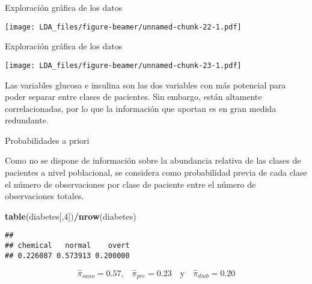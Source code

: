 \documentclass[ignorenonframetext,]{beamer}
\newenvironment{Shaded}{\begin{snugshade}}{\end{snugshade}}
\newcommand{\KeywordTok}[1]{\textcolor[rgb]{0.13,0.29,0.53}{\textbf{#1}}}
\newcommand{\DataTypeTok}[1]{\textcolor[rgb]{0.13,0.29,0.53}{#1}}
\newcommand{\DecValTok}[1]{\textcolor[rgb]{0.00,0.00,0.81}{#1}}
\newcommand{\StringTok}[1]{\textcolor[rgb]{0.31,0.60,0.02}{#1}}
\newcommand{\OperatorTok}[1]{\textcolor[rgb]{0.81,0.36,0.00}{\textbf{#1}}}
\newcommand{\NormalTok}[1]{#1}
\begin{document}
\begin{frame}{Exploración gráfica de los datos}

\texttt{[image: LDA\_files/figure-beamer/unnamed-chunk-22-1.pdf]}

\end{frame}

\begin{frame}[fragile]{Exploración gráfica de los datos}

\hypertarget{left}{}
\texttt{[image: LDA\_files/figure-beamer/unnamed-chunk-23-1.pdf]}

\hypertarget{right}{}
\begin{Shaded}
\end{Shaded}

Las variables glucosa e insulina son las dos variables con más potencial
para poder separar entre clases de pacientes. Sin embargo, están
altamente correlacionadas, por lo que la información que aportan es en
gran medida redundante.

\end{frame}

\begin{frame}[fragile]{Probabilidades a priori}

Como no se dispone de información sobre la abundancia relativa de las
clases de pacientes a nivel poblacional, se considera como probabilidad
previa de cada clase el número de observaciones por clase de paciente
entre el número de observaciones totales.

\begin{Shaded}
\begin{Highlighting}[]
\KeywordTok{table}\NormalTok{(diabetes[,}\DecValTok{4}\NormalTok{])}\OperatorTok{/}\KeywordTok{nrow}\NormalTok{(diabetes)}
\end{Highlighting}
\end{Shaded}

\begin{verbatim}
## 
## chemical   normal    overt 
## 0.226087 0.573913 0.200000
\end{verbatim}

\[\hat{\pi}_{sano}=0.57\text{,} \quad \hat{\pi}_{pre}=0.23 \quad \text{y} \quad \hat{\pi}_{diab}=0.20\]

\end{frame}
\end{document}
